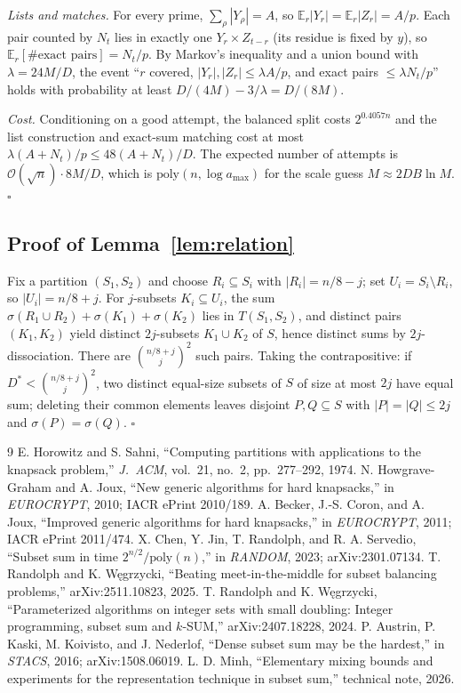 \documentclass[conference]{IEEEtran}
\newcommand{\Oh}{\mathcal{O}}
\begin{document}
\emph{Lists and matches.} For every prime, $\sum_\rho|Y_\rho|=A$, so
$\mathbb E_r|Y_r|=\mathbb E_r|Z_r|=A/p$. Each pair counted by $N_t$ lies in
exactly one $Y_r\times Z_{t-r}$ (its residue is fixed by $y$), so
$\mathbb E_r[\#\text{exact pairs}]=N_t/p$. By Markov's inequality and a union bound with
$\lambda=24M/D$, the event ``$r$ covered, $|Y_r|,|Z_r|\le\lambda A/p$, and exact pairs
$\le\lambda N_t/p$'' holds with probability at least $D/(4M)-3/\lambda=D/(8M)$.

\emph{Cost.} Conditioning on a good attempt, the balanced split costs $2^{0.4057n}$ and
the list construction and exact-sum matching cost at most
$\lambda(A+N_t)/p\le 48(A+N_t)/D$. The expected number of attempts is
$\Oh(\sqrt n)\cdot 8M/D$, which is $\mathrm{poly}(n,\log a_{\max})$ for the scale guess
$M\approx 2DB\ln M$. \hfill$\square$

\subsection{Proof of Lemma~\ref{lem:relation}}
Fix a partition $(S_1,S_2)$ and choose $R_i\subseteq S_i$ with $|R_i|=n/8-j$; set
$U_i=S_i\setminus R_i$, so $|U_i|=n/8+j$. For $j$-subsets $K_i\subseteq U_i$, the sum
$\sigma(R_1\cup R_2)+\sigma(K_1)+\sigma(K_2)$ lies in $T(S_1,S_2)$, and distinct
pairs $(K_1,K_2)$ yield distinct $2j$-subsets $K_1\cup K_2$ of $S$, hence distinct
sums by $2j$-dissociation. There are $\binom{n/8+j}{j}^2$ such pairs. Taking the
contrapositive: if $D^*<\binom{n/8+j}{j}^2$, two distinct equal-size subsets of $S$
of size at most $2j$ have equal sum; deleting their common elements leaves disjoint
$P,Q\subseteq S$ with $|P|=|Q|\le 2j$ and $\sigma(P)=\sigma(Q)$. \hfill$\square$

\begin{thebibliography}{9}
 E. Horowitz and S. Sahni, ``Computing partitions with applications
to the knapsack problem,'' \emph{J.\ ACM}, vol.~21, no.~2, pp.~277--292, 1974.
 N. Howgrave-Graham and A. Joux, ``New generic algorithms for hard
knapsacks,'' in \emph{EUROCRYPT}, 2010; IACR ePrint 2010/189.
 A. Becker, J.-S. Coron, and A. Joux, ``Improved generic algorithms
for hard knapsacks,'' in \emph{EUROCRYPT}, 2011; IACR ePrint 2011/474.
 X. Chen, Y. Jin, T. Randolph, and R. A. Servedio, ``Subset sum
in time $2^{n/2}/\mathrm{poly}(n)$,'' in \emph{RANDOM}, 2023; arXiv:2301.07134.
 T. Randolph and K. W\k{e}grzycki, ``Beating meet-in-the-middle for
subset balancing problems,'' arXiv:2511.10823, 2025.
 T. Randolph and K. W\k{e}grzycki, ``Parameterized algorithms
on integer sets with small doubling: Integer programming, subset sum and
$k$-SUM,'' arXiv:2407.18228, 2024.
 P. Austrin, P. Kaski, M. Koivisto, and J. Nederlof, ``Dense subset
sum may be the hardest,'' in \emph{STACS}, 2016; arXiv:1508.06019.
 L. D. Minh, ``Elementary mixing bounds and experiments for the
representation technique in subset sum,'' technical note, 2026.
\end{thebibliography}
\end{document}
